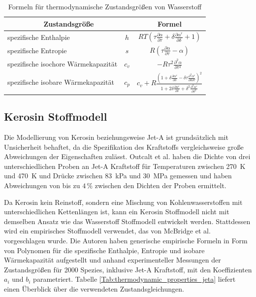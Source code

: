 \begin{table}[ht]
	\centering
	\caption{Formeln für thermodynamische Zustandsgrößen von Wasserstoff}
	\begin{tabular} {|l|c|c|} \hline%
		\multicolumn{2}{|c|}{Zustandsgröße}  & Formel\\ \hline\hline%
		spezifische Enthalpie &$h$ 		  & $RT(\tau\frac{\partial\alpha}{\partial\tau}+\delta\frac{\partial\alpha^r}{\partial\delta}+1)$ \\ \hline%
		spezifische Entropie& $s$ 		      &  $R(\tau\frac{\partial\alpha}{\partial\tau}-\alpha)$\\ \hline%
		spezifische isochore Wärmekapazität &$c_v$ 	    &  $-R\tau^2\frac{\partial^2\alpha}{\partial\tau^2}$\\ \hline%
		spezifische isobare Wärmekapazität &$c_p$        &  $c_v+R\frac{\left(1+\delta\frac{\partial\alpha^r}{\partial\delta}-\delta\tau\frac{\partial^2\alpha^r}{\partial\delta\partial\tau}\right)^2}{1+2\delta\frac{\partial\alpha^r}{\partial\delta}+\delta^2\frac{\partial^2\alpha^r}{\partial\delta^2}}$\\ \hline%
	\end{tabular}	
	\label{Tab:thermodynamic_properties_h2}%
\end{table}
\FloatBarrier 

\subsection{Kerosin Stoffmodell}

Die Modellierung von Kerosin beziehungsweise Jet-A ist grundsätzlich mit Unsicherheit behaftet, da die Spezifikation des Kraftstoffs vergleichsweise große Abweichungen der Eigenschaften zulässt. Outcalt et al. \cite{Outcalt.2009} haben die Dichte von drei unterschiedlichen Proben an Jet-A Kraftstoff für Temperaturen zwischen \SI{270}{\K} und \SI{470}{\K} und Drücke zwischen \SI{83}{\kilo\Pa} und \SI{30}{\mega\Pa} gemessen und haben Abweichungen von bis zu $4\,\%$ zwischen den Dichten der Proben ermittelt.

Da Kerosin kein Reinstoff, sondern eine Mischung von Kohlenwasserstoffen mit unterschiedlichen Kettenlängen ist, kann ein Kerosin Stoffmodell nicht mit demselben Ansatz wie das Wasserstoff Stoffmodell entwickelt werden. Stattdessen wird ein empirisches Stoffmodell verwendet, das von McBridge et al. \cite{McBridge.2002} vorgeschlagen wurde. Die Autoren haben generische empirische Formeln in Form von Polynomen für die spezifische Enthalpie, Entropie und isobare Wärmekapazität aufgestellt und anhand experimenteller Messungen der Zustandsgrößen für 2000 Spezies, inklusive Jet-A Kraftstoff, mit den Koeffizienten $a_i$ und $b_i$ parametriert. Tabelle \ref{Tab:thermodynamic_properties_jeta} liefert einen Überblick über die verwendeten Zustandsgleichungen.

